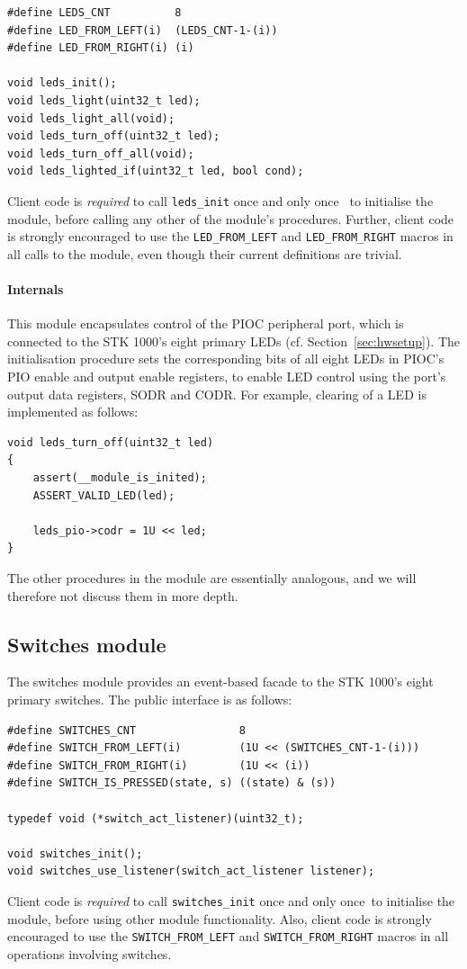 \documentclass[a4paper,9pt]{article}
\newcommand{\isrc}[1]{\texttt{#1}}
\newcommand{\oaoo}{once and only once}
\begin{document}
\begin{lstlisting}
#define LEDS_CNT          8
#define LED_FROM_LEFT(i)  (LEDS_CNT-1-(i))
#define LED_FROM_RIGHT(i) (i)

void leds_init();
void leds_light(uint32_t led);
void leds_light_all(void);
void leds_turn_off(uint32_t led);
void leds_turn_off_all(void);
void leds_lighted_if(uint32_t led, bool cond);
\end{lstlisting}
Client code is \emph{required} to call \isrc{leds\_init} \oaoo~ to
initialise the module, before calling any other of the module's procedures.
Further, client code is strongly encouraged to use the
\isrc{LED\_FROM\_LEFT} and \isrc{LED\_FROM\_RIGHT} macros in all
calls to the module, even though their current definitions are trivial.

\paragraph{Internals}
This module encapsulates control of the PIOC peripheral port, which is
connected to the STK 1000's eight primary LEDs (cf.
Section~\ref{sec:hwsetup}).  The initialisation procedure sets the
corresponding bits of all eight LEDs in PIOC's PIO enable and output enable
registers, to enable LED control using the port's output data registers, SODR
and CODR.  For example, clearing of a LED is implemented as follows:

\begin{lstlisting}
void leds_turn_off(uint32_t led)
{
    assert(__module_is_inited);
    ASSERT_VALID_LED(led);

    leds_pio->codr = 1U << led;
}
\end{lstlisting}
The other procedures in the module are essentially analogous, and we will
therefore not discuss them in more depth.


\subsection{Switches module}
The switches module provides an event-based facade to the STK 1000's eight
primary switches. The public interface is as follows:

\begin{lstlisting}
#define SWITCHES_CNT                8
#define SWITCH_FROM_LEFT(i)         (1U << (SWITCHES_CNT-1-(i)))
#define SWITCH_FROM_RIGHT(i)        (1U << (i))
#define SWITCH_IS_PRESSED(state, s) ((state) & (s))

typedef void (*switch_act_listener)(uint32_t);

void switches_init();
void switches_use_listener(switch_act_listener listener);
\end{lstlisting}
Client code is \emph{required} to call \isrc{switches\_init} \oaoo~to
initialise the module, before using other module functionality.  Also,
client code is strongly encouraged to use the \isrc{SWITCH\_FROM\_LEFT}
and \isrc{SWITCH\_FROM\_RIGHT} macros in all operations involving
switches.
\end{document}
